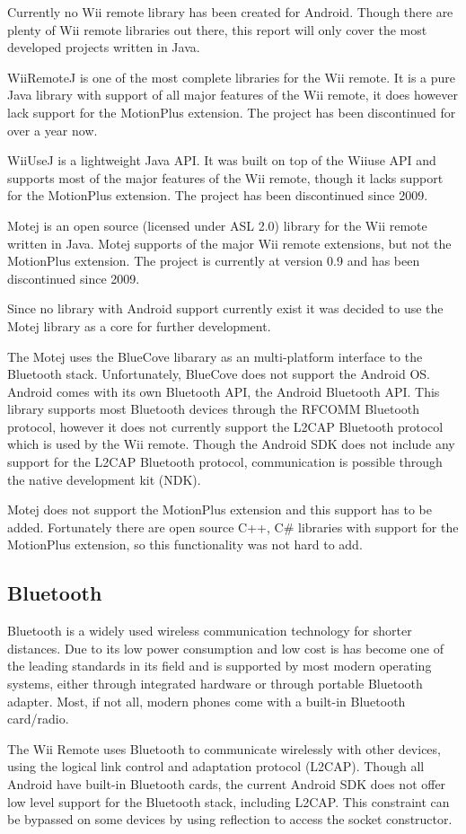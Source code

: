 \documentclass[11pt,twoside,a4paper]{report}
\begin{document}
Currently no Wii remote library has been created for Android. Though there are plenty of Wii remote libraries out there, this report will only cover the most developed projects written in Java.

WiiRemoteJ is one of the most complete libraries for the Wii remote. It is a pure Java library with support of all major features of the Wii remote, it does however lack support for the MotionPlus extension. The project has been discontinued for over a year now. 

WiiUseJ is a lightweight Java API. It was built on top of the Wiiuse API and supports most of the major features of the Wii remote, though it lacks support for the MotionPlus extension. The project has been discontinued since 2009.

Motej is an open source (licensed under ASL 2.0) library for the Wii remote written in Java. Motej supports of the major Wii remote extensions, but not the MotionPlus extension. The project is currently at version 0.9 and has been discontinued since 2009.

Since no library with Android support currently exist it was decided to use the Motej library as a core for further development.

The Motej uses the BlueCove libarary as an multi-platform interface to the Bluetooth stack. Unfortunately, BlueCove does not support the Android OS. Android comes with its own Bluetooth API, the Android Bluetooth API. This library supports most Bluetooth devices through the RFCOMM Bluetooth protocol, however it does not currently support the L2CAP Bluetooth protocol which is used by the Wii remote. Though the Android SDK does not include any support for the L2CAP Bluetooth protocol, communication is possible through the native development kit (NDK). %

Motej does not support the MotionPlus extension and this support has to be added. Fortunately there are open source C++, C\# libraries with support for the MotionPlus extension, so this functionality was not hard to add.

\subsection{Bluetooth}
Bluetooth is a widely used wireless communication technology for shorter distances. Due to its low power consumption and low cost is has become one of the leading standards in its field and is supported by most modern operating systems, either through integrated hardware or through portable Bluetooth adapter. Most, if not all, modern phones come with a built-in Bluetooth card/radio. 

The Wii Remote uses Bluetooth to communicate wirelessly with other devices, using the logical link control and adaptation protocol (L2CAP). Though all Android have built-in Bluetooth cards, the current Android SDK does not offer low level support for the Bluetooth stack, including L2CAP. This constraint can be bypassed on some devices by using reflection to access the socket constructor. 
\end{document}
